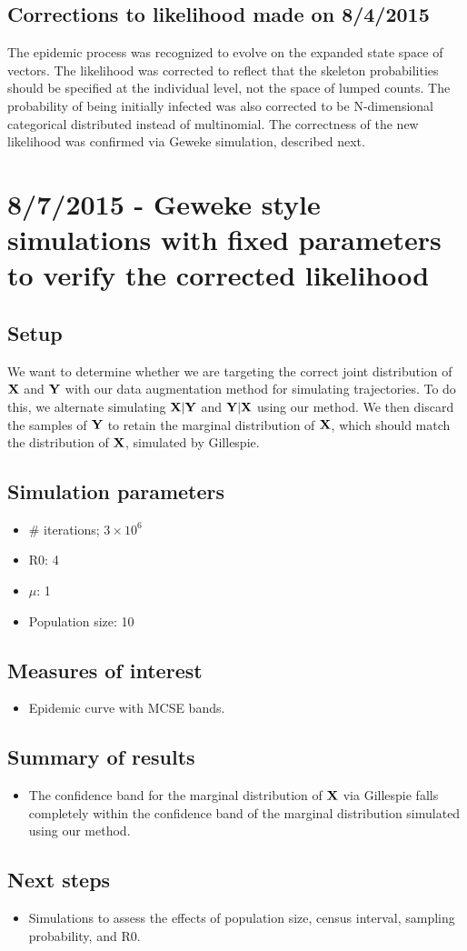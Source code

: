 \subsection*{Corrections to likelihood made on 8/4/2015}
The epidemic process was recognized to evolve on the expanded state space of vectors. The likelihood was corrected to reflect that the skeleton probabilities should be specified at the individual level, not the space of lumped counts. The probability of being initially infected was also corrected to be N-dimensional categorical distributed instead of multinomial. The correctness of the new likelihood was confirmed via Geweke simulation, described next. 
\section*{8/7/2015 - Geweke style simulations with fixed parameters to verify the corrected likelihood }
\subsection*{Setup}
We want to determine whether we are targeting the correct joint distribution of $ \mathbf{X} $ and $ \mathbf{Y} $ with our data augmentation method for simulating trajectories. To do this, we alternate simulating $ \mathbf{X} | \mathbf{Y} $ and $ \mathbf{Y} | \mathbf{X} $ using our method. We then discard the samples of $ \mathbf{Y} $ to retain the marginal distribution of $ \mathbf{X} $, which should match the distribution of $ \mathbf{X} $, simulated by Gillespie.

\subsection*{Simulation parameters}
\begin{itemize}
	\item \# iterations; $ 3\times 10^6 $
	\item R0: 4
	\item $ \mu $: 1
	\item Population size: 10
\end{itemize}

\subsection*{Measures of interest}
\begin{itemize}
	\item Epidemic curve with MCSE bands.
\end{itemize}

\subsection*{Summary of results}
\begin{itemize}
	\item The confidence band for the marginal distribution of $ \mathbf{X} $ via Gillespie falls completely within the confidence band of the marginal distribution simulated using our method. 
\end{itemize}

\subsection*{Next steps}
\begin{itemize}
	\item Simulations to assess the effects of population size, census interval, sampling probability, and R0. 
\end{itemize}